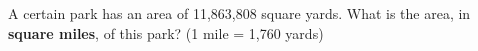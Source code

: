 \vspace{2em}

\noindent\markforreview
\vspace{1em}

A certain park has an area of 11,863,808 square yards.  
What is the area, in \textbf{square miles}, of this park?  
(1 mile = 1,760 yards)

\vspace{0.75em}


\newpage
